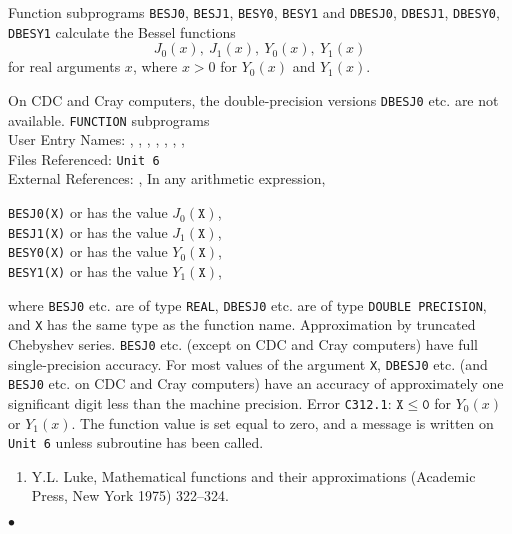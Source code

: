                
          
\Submitter{}                   
          
Function subprograms
{\tt BESJ0}, {\tt BESJ1}, {\tt BESY0}, {\tt BESY1} and
{\tt DBESJ0}, {\tt DBESJ1}, {\tt DBESY0}, {\tt DBESY1}
calculate the Bessel functions
$$J_0(x), \ J_1(x), \ Y_0(x), \ Y_1(x)$$
for real arguments $x$, where $ x>0 $ for $Y_0(x)$ and $Y_1(x)$.
\par
On CDC and Cray computers, the double-precision versions
{\tt DBESJ0} etc. are not available.
\Structure
{\tt FUNCTION} subprograms\\
User Entry Names:
, , , ,
, , , \\
Files Referenced: {\tt Unit 6} \\
External References: , 
\Usage
In any arithmetic expression,
\begin{center}
\parbox{.6\textwidth}{
{\tt BESJ0(X)} \quad or  \quad has the value \quad
$J_0(\mathtt{X})$, \\
{\tt BESJ1(X)} \quad or  \quad has the value \quad
$J_1(\mathtt{X})$, \\
{\tt BESY0(X)} \quad or  \quad has the value \quad
$Y_0(\mathtt{X})$, \\
{\tt BESY1(X)} \quad or  \quad has the value \quad
$Y_1(\mathtt{X})$,
}\end{center}
where {\tt BESJ0} etc. are of type {\tt REAL}, {\tt DBESJ0} etc.
are of type {\tt DOUBLE PRECISION}, and {\tt X} has the same type as the
function name.
\Method
Approximation by truncated Chebyshev series.
\Accuracy
{\tt BESJ0} etc. (except on CDC and Cray computers)
have full single-precision accuracy.
For most values of the argument {\tt X}, {\tt DBESJ0} etc.
(and {\tt BESJ0} etc. on CDC and Cray computers) have an accuracy of
approximately one significant digit less than the machine precision.
\Errorh
Error {\tt C312.1}:  $\mathtt{X \leq 0}$ for $Y_0(x)$ or $Y_1(x)$.
The function value is set equal to zero, and a message is written on
{\tt Unit 6} unless subroutine  has been called.
\Refer
\begin{enumerate}
\item Y.L. Luke, Mathematical functions and their
approximations (Academic Press, New York 1975) 322--324.
\end{enumerate}
$\bullet$
